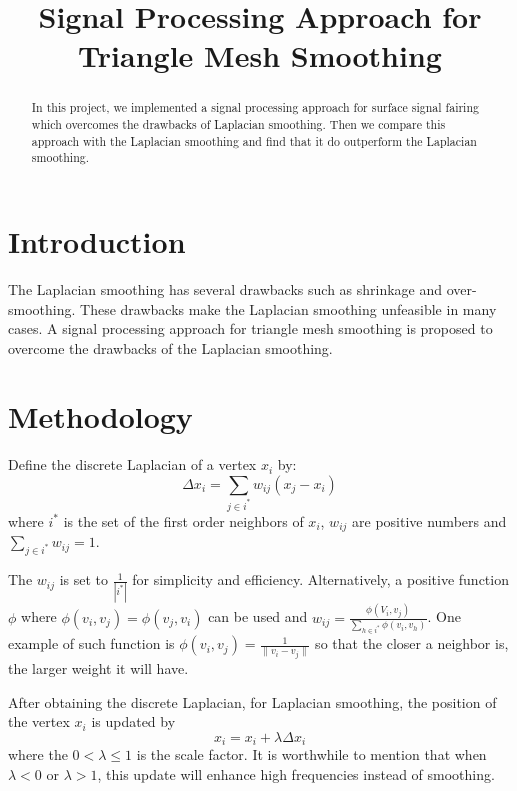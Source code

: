 \documentclass[conference]{IEEEtran}
\begin{document}
\title{Signal Processing Approach for Triangle Mesh Smoothing}
\author{}
\maketitle

\begin{abstract}
In this project, we implemented a signal processing approach for surface signal fairing \cite{taubin1995signal} which overcomes the drawbacks of Laplacian smoothing. Then we compare this approach with the Laplacian smoothing and find that it do outperform the Laplacian smoothing. 
\end{abstract}

\section{Introduction}

The Laplacian smoothing has several drawbacks such as shrinkage and over-smoothing. These drawbacks make the Laplacian smoothing unfeasible in many cases. A signal processing approach for triangle mesh smoothing \cite{taubin1995signal} is proposed to overcome the drawbacks of the Laplacian smoothing.

\section{Methodology}

Define the discrete Laplacian of a vertex $x_i$ by:
\begin{equation}
\Delta x_i = \sum_{j\in i^*}w_{ij}(x_j-x_i)
\end{equation}
where $i^*$ is the set of the first order neighbors of $x_i$, $w_{ij}$ are positive numbers and $\sum_{j\in i^*}w_{ij}=1$.

The $w_{ij}$ is set to $\frac{1}{|i^*|}$ for simplicity and efficiency. Alternatively, a positive function $\phi$ where $\phi(v_i,v_j)=\phi(v_j,v_i)$ can be used and $w_{ij}=\frac{\phi(V_i,v_j)}{\sum_{h\in i^*}\phi(v_i,v_h)}$. One example of such function is $\phi(v_i,v_j)=\frac{1}{\|v_i-v_j\|}$  so that the closer a neighbor is, the larger weight it will have.

After obtaining the discrete Laplacian, for Laplacian smoothing, the position of the vertex $x_i$ is updated by
\begin{equation}
x_i=x_i+\lambda\Delta x_i
\end{equation}
where the $0<\lambda\leq1$ is the scale factor. It is worthwhile to mention that when $\lambda<0$ or $\lambda>1$, this update will enhance high frequencies instead of smoothing.
\end{document}

